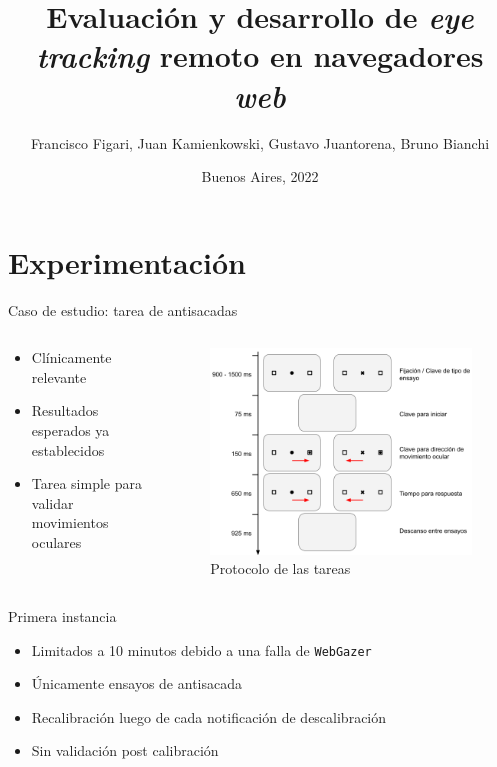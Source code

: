 \documentclass[aspectratio=169]{beamer}
\title{Evaluación y desarrollo de \textit{eye tracking} remoto en navegadores
\textit{web}}
\author{Francisco Figari, Juan Kamienkowski, Gustavo Juantorena, Bruno Bianchi}
\date{Buenos Aires, 2022}
\begin{document}
\frame{\titlepage}

\section{Experimentación}

\begin{frame}{Caso de estudio: tarea de antisacadas}

  \begin{columns}
    \begin{column}{.5\textwidth}
      \begin{itemize}
        \item Clínicamente relevante
        \item Resultados esperados ya establecidos
        \item Tarea simple para validar movimientos oculares
      \end{itemize}
    \end{column}
    \begin{column}{.5\textwidth}
      \begin{figure}
        \centering
        \includegraphics[width=\linewidth]{img/antisaccades-protocol.png}
        \caption{Protocolo de las tareas}
      \end{figure}
    \end{column}
  \end{columns}

\end{frame}

\begin{frame}{Primera instancia}
  \begin{itemize}
    \item Limitados a 10 minutos debido a una falla de \texttt{WebGazer}
    \item Únicamente ensayos de antisacada
    \item Recalibración luego de cada notificación de descalibración
    \item Sin validación post calibración
  \end{itemize}
\end{frame}
\end{document}
